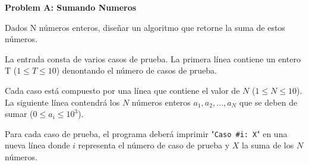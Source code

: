 \textbf{\LARGE{\textsf{Problem A: Sumando Numeros}}}

Dados N números enteros, diseñar un algoritmo que retorne la suma de estos números.

\InputFile

La entrada consta de varios casos de prueba. La primera línea contiene un entero T ($1 \leq T \leq 10$) denontando el número de casos de prueba.

Cada caso está compuesto por una línea que contiene el valor de $N$ ($1 \leq N \leq 10$). La siguiente línea contendrá los $N$ números enteros $a_1, a_2, \dots, a_N$ 
que se deben de sumar ($0 \leq a_i \leq 10^3$).

\OutputFile

Para cada caso de prueba, el programa deberá imprimir "\texttt{Caso \#i: X}" en una nueva línea donde $i$ representa el número de caso de prueba y $X$ la suma de los $N$ números.

\Example
\begin{example}
%
\end{example}

